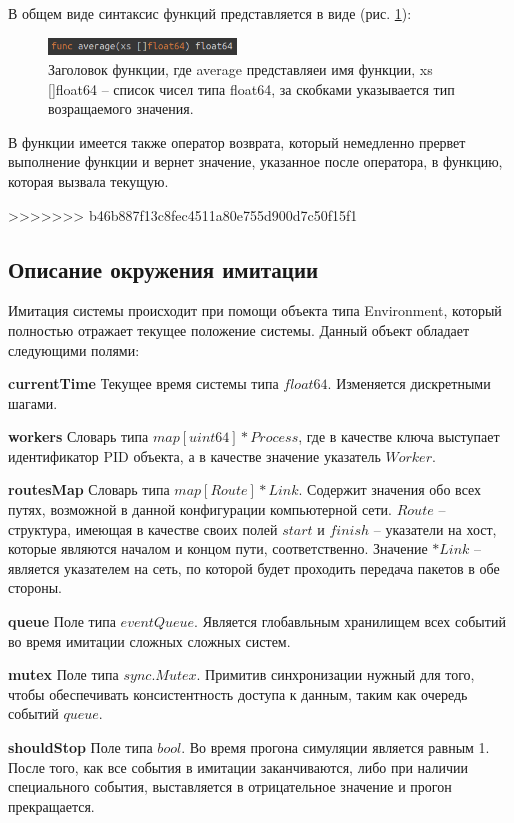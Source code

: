 В общем виде синтаксис функций представляется в виде (рис. \ref{fig:func-body}):

\begin{figure}[!ht]
\centering
\includegraphics[width=5cm]{Kenenbek/images/func-body.png}
\caption{Заголовок функции, где average представляеи имя функции, xs []float64 -- список чисел типа float64, за скобками указывается тип возращаемого значения.}
\label{fig:func-body}
\end{figure}

\par 
В функции имеется также оператор возврата, который немедленно прервет выполнение функции и вернет значение, указанное после оператора, в функцию, которая вызвала текущую.


>>>>>>> b46b887f13c8fec4511a80e755d900d7c50f15f1
\subsection{Описание окружения имитации}

Имитация системы происходит при помощи объекта типа Environment, который полностью отражает текущее положение системы. Данный объект обладает следующими полями:

\textbf{currentTime}
Текущее время системы типа $float64$. Изменяется дискретными шагами.

\textbf{workers}
Словарь типа $map[uint64]*Process$, где в качестве ключа выступает идентификатор PID объекта, а в качестве значение указатель $Worker$.

\textbf{routesMap}  
Словарь типа  $map[Route]*Link$. Содержит значения обо всех путях, возможной в данной конфигурации компьютерной сети. $Route$ -- структура, имеющая в качестве своих полей $start$ и $finish$ -- указатели на хост, которые являются началом и концом пути, соответственно. Значение $*Link$ -- является указателем на сеть, по которой будет проходить передача пакетов в обе стороны.


\textbf{queue}
Поле типа $eventQueue$. Является глобавльным хранилищем всех событий во время имитации сложных сложных систем.

\textbf{mutex}         
Поле типа $sync.Mutex$. Примитив синхронизации нужный для того, чтобы обеспечивать консистентность доступа к данным, таким как очередь событий $queue$. 

\textbf{shouldStop}    
Поле типа $bool$. Во время прогона симуляции является равным 1. После того, как все события в имитации заканчиваются, либо при наличии специального события, выставляется в отрицательное значение и прогон прекращается.

